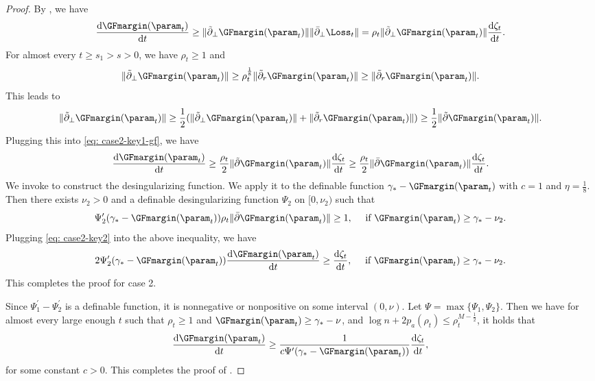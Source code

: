 \begin{proof}
By , we have 
\begin{equation}
\label{eq: case2-key1-gf}
       \frac{\mathrm{d} \GFmargin(\param_t)}{\mathrm{d}  t} \ge  \| \tilde \partial_\perp \GFmargin(\param_t) \| \| \bar  \partial_\perp \Loss_t\| =\rho_t \|  \tilde \partial_\perp \GFmargin(\param_t) \| \frac{\mathrm{d}  \zeta_t}{\mathrm{d} t}. 
\end{equation}
For almost every $t\ge s_1 >s >0$, we have $\rho_t \ge 1$ and 
\[
    \| \tilde \partial_\perp \GFmargin(\param_t) \| \ge  \rho_t^{\frac{1}{8}} \| \tilde \partial_r \GFmargin(\param_t) \| \ge \| \tilde \partial_r \GFmargin(\param_t) \|.
\]
This leads to 
\[
    \| \tilde \partial_\perp \GFmargin(\param_t) \| \ge \frac{1}{2} ( \| \tilde \partial_\perp \GFmargin(\param_t) \| + \| \tilde \partial_r\GFmargin(\param_t) \|) \ge \frac{1}{2} \| \tilde \partial \GFmargin(\param_t)\|. 
\]
Plugging this into \eqref{eq: case2-key1-gf}, we have 
\begin{equation}
\label{eq: case2-key2}
\frac{\mathrm{d} \GFmargin(\param_t)}{\mathrm{d}  t} \ge  \frac{\rho_t}{2} \| \tilde \partial  \GFmargin(\param_t)\| \frac{\mathrm{d} \zeta_t}{\mathrm{d} t} \ge \frac{\rho_t}{2} \| \bar  \partial  \GFmargin(\param_t)\| \frac{\mathrm{d} \zeta_t}{\mathrm{d} t}.
\end{equation}
We invoke  to construct the desingularizing function.  We apply it to the definable function $\gamma_* - \GFmargin(\param_t)$ with $c=1$ and $\eta=\frac{1}{8}$. Then there exists $\nu_2 >0$ and a definable desingularizing function $\Psi_2$ on $[0, \nu_2)$ such that
\[
    \Psi_2^\prime(\gamma_* - \GFmargin(\param_t)) \rho_t \|\bar \partial \GFmargin(\param_t)\| \ge 1, \quad \text{ if }  \GFmargin(\param_t) \ge \gamma_* - \nu_2.
\]
Plugging \eqref{eq: case2-key2} into the above inequality, we have 
\[
    2\Psi_2^\prime(\gamma_* - \GFmargin(\param_t)) \frac{\mathrm{d} \GFmargin(\param_t)}{\mathrm{d}  t} \ge \frac{\mathrm{d} \zeta_t}{\mathrm{d}  t}, \quad \text{ if }  \GFmargin(\param_t) \ge \gamma_* - \nu_2.
\]
This completes the proof for case 2. 

Since $\Psi_1^\prime  - \Psi_2^\prime$ is a definable function, it is nonnegative or nonpositive on some interval $(0, \nu)$. Let $\Psi = \max \{\Psi_1, \Psi_2\}$. Then we have for almost every large enough $t$ such that $\rho_t \ge 1$ and $\GFmargin(\param_t) \ge \gamma_* - \nu$, and $\log n + 2p_a(\rho_t) \le \rho_t^{M-\frac{1}{2}}$, it holds that 
\[
    \frac{\mathrm{d}  \GFmargin(\param_t)}{\mathrm{d} t} \ge \frac{1}{c \Psi' (\gamma_* - \GFmargin(\param_t))} \frac{\mathrm{d}  \zeta_t}{\mathrm{d}  t},
\]
for some constant $c>0$. This completes the proof of .
\end{proof}


